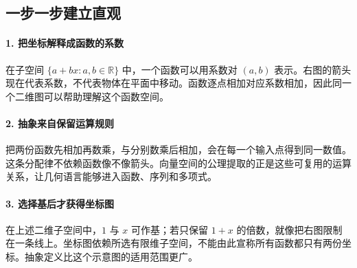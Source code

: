 \subsection*{一步一步建立直观}

\paragraph{1. 把坐标解释成函数的系数}

在子空间 $\{a+bx:a,b\in\mathbb R\}$ 中，一个函数可以用系数对 $(a,b)$ 表示。右图的箭头现在代表系数，不代表物体在平面中移动。函数逐点相加对应系数相加，因此同一个二维图可以帮助理解这个函数空间。



\paragraph{2. 抽象来自保留运算规则}

把两份函数先相加再数乘，与分别数乘后相加，会在每一个输入点得到同一数值。这条分配律不依赖函数像不像箭头。向量空间的公理提取的正是这些可复用的运算关系，让几何语言能够进入函数、序列和多项式。



\paragraph{3. 选择基后才获得坐标图}

在上述二维子空间中，$1$ 与 $x$ 可作基；若只保留 $1+x$ 的倍数，就像把右图限制在一条线上。坐标图依赖所选有限维子空间，不能由此宣称所有函数都只有两份坐标。抽象定义比这个示意图的适用范围更广。
